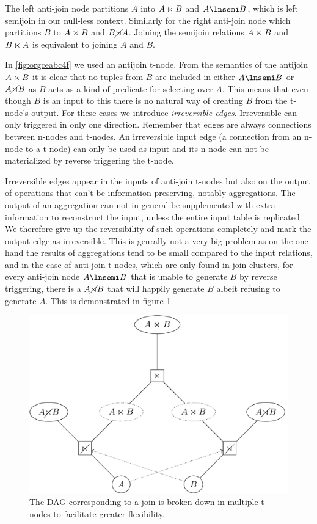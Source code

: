 The left anti-join node partitions \(A\) into \(A \ltimes B\) and
\(A \lnsemi B\), which is left semijoin in our null-less
context. Similarly for the right anti-join node which partitions \(B\) to \(A \rtimes B\) and \(B \cancel\rtimes A\). Joining the semijoin
relations \(A \ltimes B\) and \(B \ltimes A\) is equivalent to
joining \(A\) and \(B\).

In \ref{fig:orgceabc4f} we used an antijoin t-node. From the semantics of the
antijoin \(A \ltimes B\) it is clear that no tuples from \(B\) are
included in either \(A \lnsemi B\) or \(A \cancel\rtimes B\) as \(B\) acts
as a kind of predicate for selecting over \(A\). This means that even
though \(B\) is an input to this there is no natural way of creating \(B\)
from the t-node's output. For these cases we introduce \emph{irreversible
  edges}. Irreversible can only triggered in only one
direction. Remember that edges are always connections between n-nodes
and t-nodes. An irreversible input edge (a connection from an n-node
to a t-node) can only be used as input and its n-node can not be
materialized by reverse triggering the t-node.

Irreversible edges appear in the inputs of anti-join t-nodes but also
on the output of operations that can't be information preserving,
notably aggregations. The output of an aggregation can not in general
be supplemented with extra information to reconstruct the input,
unless the entire input table is replicated. We therefore give up the
reversibility of such operations completely and mark the output edge
as irreversible. This is genrally not a very big problem as on the one
hand the results of aggregations tend to be small compared to the
input relations, and in the case of anti-join t-nodes, which are only
found in join clusters, for every anti-join node \(A \lnsemi B\) that
is unable to generate \(B\) by reverse triggering, there is a \(A
\cancel\rtimes B\) that will happily generate \(B\) albeit refusing to
generate \(A\). This is demonstrated in figure \ref{fig:orgc670489}.

\begin{figure}[p]
  \centering
  \includegraphics[width=.9\linewidth]{./imgs/joinnetdir.pdf}
  \caption{\label{fig:orgc670489}The DAG corresponding to a join is broken down in multiple t-nodes to facilitate greater flexibility.}
\end{figure}
